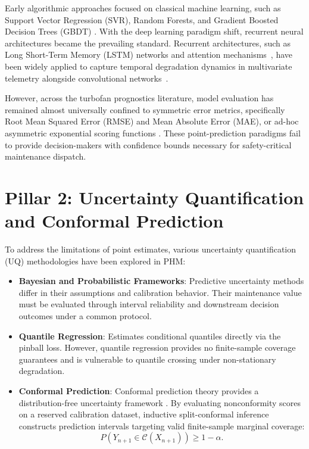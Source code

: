 Early algorithmic approaches focused on classical machine learning, such as Support Vector Regression (SVR), Random Forests, and Gradient Boosted Decision Trees (GBDT) \cite{huang2021survey}. With the deep learning paradigm shift, recurrent neural architectures became the prevailing standard. Recurrent architectures, such as Long Short-Term Memory (LSTM) networks and attention mechanisms~\cite{diao2026turbofan}, have been widely applied to capture temporal degradation dynamics in multivariate telemetry alongside convolutional networks~\cite{chen2022data}.

However, across the turbofan prognostics literature, model evaluation has remained almost universally confined to symmetric error metrics, specifically Root Mean Squared Error (RMSE) and Mean Absolute Error (MAE), or ad-hoc asymmetric exponential scoring functions \cite{saxena2008damage}. These point-prediction paradigms fail to provide decision-makers with confidence bounds necessary for safety-critical maintenance dispatch.

\section{Pillar 2: Uncertainty Quantification and Conformal Prediction}
To address the limitations of point estimates, various uncertainty quantification (UQ) methodologies have been explored in PHM:
\begin{itemize}
    \item \textbf{Bayesian and Probabilistic Frameworks}: Predictive uncertainty methods differ in their assumptions and calibration behavior. Their maintenance value must be evaluated through interval reliability and downstream decision outcomes under a common protocol.
    \item \textbf{Quantile Regression}: Estimates conditional quantiles directly via the pinball loss. However, quantile regression provides no finite-sample coverage guarantees and is vulnerable to quantile crossing under non-stationary degradation.
    \item \textbf{Conformal Prediction}: Conformal prediction theory provides a distribution-free uncertainty framework \cite{javanmardi2023conformal}. By evaluating nonconformity scores on a reserved calibration dataset, inductive split-conformal inference constructs prediction intervals targeting valid finite-sample marginal coverage:
    \begin{equation}
    P(Y_{n+1} \in \mathcal{C}(X_{n+1})) \ge 1 - \alpha.
    \end{equation}
\end{itemize}

